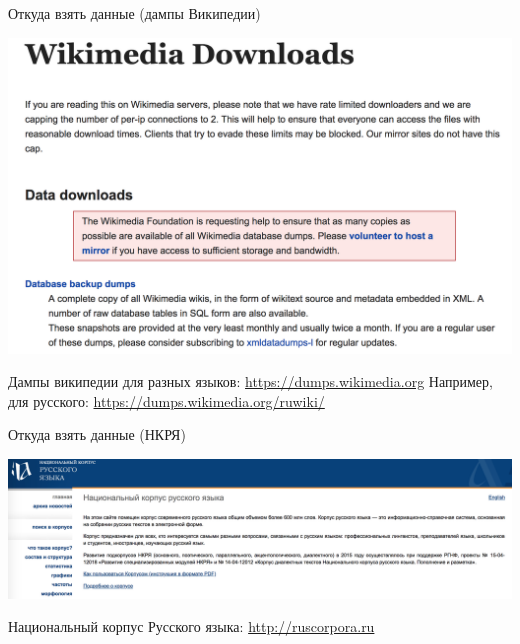 \documentclass[notes,12pt, aspectratio=169]{beamer}
\begin{document}
\begin{frame}{Откуда взять данные (дампы Википедии)}
	\begin{center}
		\includegraphics[width=.7\linewidth]{wiki_dumps.png}
	\end{center}
	
	\vfill
	
	\footnotesize Дампы википедии для разных языков:  {\color{blue} \url{https://dumps.wikimedia.org}} \newline Например, для русского:  {\color{blue} \url{https://dumps.wikimedia.org/ruwiki/}} 
\end{frame} 


\begin{frame}{Откуда взять данные (НКРЯ)}
	\begin{center}
	\includegraphics[width=.99\linewidth]{ruscorp.png}
	\end{center}
	
	\vfill
	
	\footnotesize Национальный корпус Русского языка:  {\color{blue} \url{http://ruscorpora.ru}} 
\end{frame} 
\end{document}
